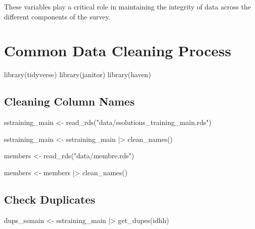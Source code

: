 \documentclass[
  letterpaper,
  DIV=11,
  numbers=noendperiod]{scrreprt}
\newenvironment{Shaded}{\begin{snugshade}}{\end{snugshade}}
\newcommand{\FunctionTok}[1]{\textcolor[rgb]{0.28,0.35,0.67}{#1}}
\newcommand{\NormalTok}[1]{\textcolor[rgb]{0.00,0.23,0.31}{#1}}
\newcommand{\OtherTok}[1]{\textcolor[rgb]{0.00,0.23,0.31}{#1}}
\newcommand{\SpecialCharTok}[1]{\textcolor[rgb]{0.37,0.37,0.37}{#1}}
\newcommand{\StringTok}[1]{\textcolor[rgb]{0.13,0.47,0.30}{#1}}
\begin{document}
These variables play a critical role in maintaining the integrity of
data across the different components of the survey.

\section{Common Data Cleaning
Process}\label{common-data-cleaning-process}

\begin{Shaded}
\begin{Highlighting}[]
\FunctionTok{library}\NormalTok{(tidyverse)}
\FunctionTok{library}\NormalTok{(janitor)}
\FunctionTok{library}\NormalTok{(haven)}
\end{Highlighting}
\end{Shaded}

\subsection{Cleaning Column Names}\label{cleaning-column-names}

\begin{Shaded}
\begin{Highlighting}[]
\NormalTok{sstraining\_main }\OtherTok{\textless{}{-}} \FunctionTok{read\_rds}\NormalTok{(}\StringTok{"data/ssolutions\_training\_main.rds"}\NormalTok{)}



\NormalTok{sstraining\_main }\OtherTok{\textless{}{-}}\NormalTok{ sstraining\_main }\SpecialCharTok{|\textgreater{}} 
  \FunctionTok{clean\_names}\NormalTok{()}


\NormalTok{members }\OtherTok{\textless{}{-}} \FunctionTok{read\_rds}\NormalTok{(}\StringTok{"data/membre.rds"}\NormalTok{)}

\NormalTok{members }\OtherTok{\textless{}{-}}\NormalTok{ members }\SpecialCharTok{|\textgreater{}} 
  \FunctionTok{clean\_names}\NormalTok{()}
\end{Highlighting}
\end{Shaded}

\subsection{Check Duplicates}\label{check-duplicates}

\begin{Shaded}
\begin{Highlighting}[]
\NormalTok{dups\_ssmain }\OtherTok{\textless{}{-}}\NormalTok{ sstraining\_main }\SpecialCharTok{|\textgreater{}} 
  \FunctionTok{get\_dupes}\NormalTok{(idhh)}
\end{Highlighting}
\end{Shaded}
\end{document}
